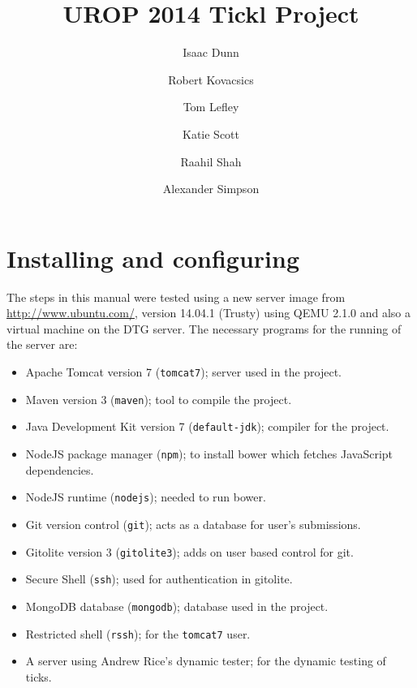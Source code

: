 \documentclass[12pt,a4paper]{article}
\title{\vspace{-48pt}
  UROP 2014 Tickl Project
}
\author{Isaac Dunn
  \and Robert Kovacsics
  \and Tom Lefley
  \and Katie Scott
  \and Raahil Shah
  \and Alexander Simpson
}
\begin{document}
\maketitle
\section{Installing and configuring}
The steps in this manual were tested using a new server image from \url{http://www.ubuntu.com/}, version 14.04.1 (Trusty) using QEMU 2.1.0 and also a virtual machine on the DTG server.
The necessary programs for the running of the server are:
\begin{itemize}
  \item Apache Tomcat version 7 ({\tt tomcat7}); server used in the project.
  \item Maven version 3 ({\tt maven}); tool to compile the project.
  \item Java Development Kit version 7 ({\tt default-jdk}); compiler for the project.
  \item NodeJS package manager ({\tt npm}); to install bower which fetches JavaScript dependencies.
  \item NodeJS runtime ({\tt nodejs}); needed to run bower.
  \item Git version control ({\tt git}); acts as a database for user's submissions.
  \item Gitolite version 3 ({\tt gitolite3}); adds on user based control for git.
  \item Secure Shell ({\tt ssh}); used for authentication in gitolite.
  \item MongoDB database ({\tt mongodb}); database used in the project.
  \item Restricted shell ({\tt rssh}); for the {\tt tomcat7} user.
  \item A server using Andrew Rice's dynamic tester; for the dynamic testing of ticks.
\end{itemize}
\end{document}
